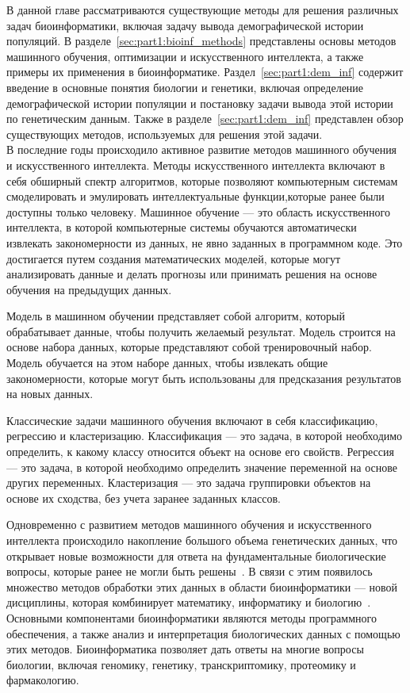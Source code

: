 В данной главе рассматриваются существующие методы для решения различных задач биоинформатики, включая задачу вывода демографической истории популяций.
В разделе~\ref{sec:part1:bioinf_methods} представлены основы методов машинного обучения, оптимизации и искусственного интеллекта, а также примеры их применения в биоинформатике.
Раздел~\ref{sec:part1:dem_inf} содержит введение в основные понятия биологии и генетики, включая определение демографической истории популяции и постановку задачи вывода этой истории по генетическим данным.
Также в разделе~\ref{sec:part1:dem_inf} представлен обзор существующих методов, используемых для решения этой задачи.
\\




В последние годы происходило активное развитие методов машинного обучения и искусственного интеллекта.
Методы искусственного интеллекта включают в себя обширный спектр алгоритмов, которые позволяют компьютерным системам смоделировать и эмулировать интеллектуальные функции,которые ранее были доступны только человеку.
Машинное обучение --- это область искусственного интеллекта, в которой компьютерные системы обучаются автоматически извлекать закономерности из данных, не явно заданных в программном коде.
Это достигается путем создания математических моделей, которые могут анализировать данные и делать прогнозы или принимать решения на основе обучения на предыдущих данных.

Модель в машинном обучении представляет собой алгоритм, который обрабатывает данные, чтобы получить желаемый результат.
Модель строится на основе набора данных, которые представляют собой тренировочный набор.
Модель обучается на этом наборе данных, чтобы извлекать общие закономерности, которые могут быть использованы для предсказания результатов на новых данных.

Классические задачи машинного обучения включают в себя классификацию, регрессию и кластеризацию.
Классификация --- это задача, в которой необходимо определить, к какому классу относится объект на основе его свойств.
Регрессия --- это задача, в которой необходимо определить значение переменной на основе других переменных. 
Кластеризация --- это задача группировки объектов на основе их сходства, без учета заранее заданных классов.

Одновременно с развитием методов машинного обучения и искусственного интеллекта происходило накопление большого объема генетических данных, что открывает новые возможности для ответа на фундаментальные биологические вопросы, которые ранее не могли быть решены~\cite{galperin2010complete}.
В связи с этим появилось множество методов обработки этих данных в области биоинформатики --- новой дисциплины, которая комбинирует математику, информатику и биологию~\cite{maloy2013brenner}.
Основными компонентами биоинформатики являются методы программного обеспечения, а также анализ и интерпретация биологических данных с помощью этих методов.
Биоинформатика позволяет дать ответы на многие вопросы биологии, включая геномику, генетику, транскриптомику, протеомику и фармакологию.


